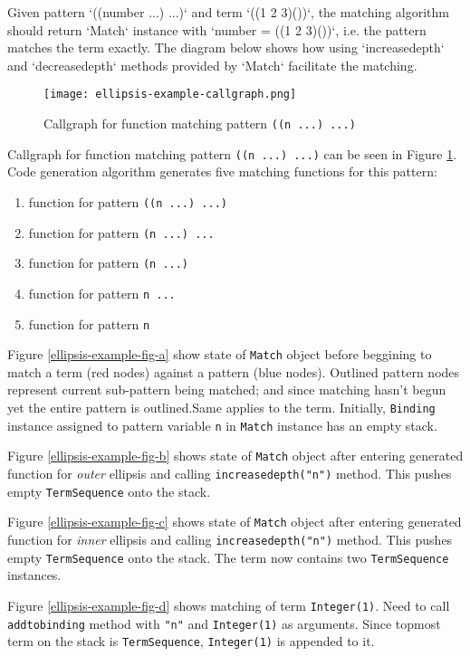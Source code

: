 Given pattern `((number ...) ...)` and term `((1 2 3)())`, the matching algorithm should return `Match` instance with `number = ((1 2 3)())`, i.e. the pattern matches the term exactly. The diagram below shows how using `increasedepth` and `decreasedepth` methods provided by `Match` facilitate the matching. 


\begin{figure}[h]
\texttt{[image: ellipsis-example-callgraph.png]}
\caption{Callgraph for function matching pattern \texttt{((n ...) ...)}}
\label{ellipsis-example-callgraph}
\end{figure}

Callgraph for function matching pattern \texttt{((n ...) ...)} can be seen in Figure \ref{ellipsis-example-callgraph}. Code generation algorithm generates five matching functions for this pattern:

\begin{enumerate}
\item function for pattern \texttt{((n ...) ...)}
\item function for pattern \texttt{(n ...) ...}
\item function for pattern \texttt{(n ...) }
\item function for pattern \texttt{n ... }
\item function for pattern \texttt{n}
\end{enumerate}


Figure \ref{ellipsis-example-fig-a} show state of \texttt{Match} object before beggining to match a term (red nodes) against a pattern (blue nodes). Outlined pattern nodes represent current sub-pattern being matched; and since matching hasn't begun yet the entire pattern is outlined.Same applies to the term. Initially, \texttt{Binding} instance assigned to pattern variable \texttt{n} in \texttt{Match} instance has an empty stack.

Figure \ref{ellipsis-example-fig-b} shows state of \texttt{Match} object after entering generated function for \textit{outer} ellipsis and calling \texttt{increasedepth("n")} method. This pushes empty \texttt{TermSequence} onto the stack.


Figure \ref{ellipsis-example-fig-c} shows state of \texttt{Match} object after entering generated function for \textit{inner} ellipsis and calling \texttt{increasedepth("n")} method. This pushes empty \texttt{TermSequence} onto the stack. The term now contains two \texttt{TermSequence} instances.

Figure \ref{ellipsis-example-fig-d} shows matching of term \texttt{Integer(1)}. Need to call \texttt{addtobinding} method with \texttt{"n"} and \texttt{Integer(1)} as arguments. Since topmost term on the stack is \texttt{TermSequence}, \texttt{Integer(1)} is appended to it.

